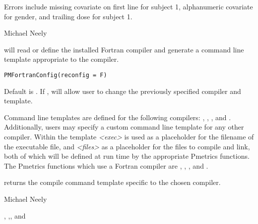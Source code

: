 \documentclass[a4paper]{book}
\begin{document}
%
\begin{Details}\relax
Errors include missing covariate on first line for subject 1, alphanumeric covariate for
gender, and trailing dose for subject 1.
\end{Details}
%
\begin{Author}\relax
Michael Neely
\end{Author}
%
\begin{Description}\relax
{} will read or define the installed Fortran compiler and generate
a command line template appropriate to the compiler.
\end{Description}
%
\begin{Usage}
\begin{verbatim}
PMFortranConfig(reconfig = F)
\end{verbatim}
\end{Usage}
%
\begin{Arguments}
\begin{ldescription}
\item[\code{reconfig}] Default is .  If , will allow user to change
the previously specified compiler and template.
\end{ldescription}
\end{Arguments}
%
\begin{Details}\relax
Command line templates are defined for the following compilers: , ,
, and .  Additionally, users may specify a custom command line
template for any other compiler.  Within the template \emph{<exec>} is used as a placeholder
for the filename of the executable file, and \emph{<files>} as a placeholder for the files to
compile and link, both of which will be defined at run time by the appropriate Pmetrics functions.
The Pmetrics functions which use a Fortran compiler are , ,
, and .
\end{Details}
%
\begin{Value}
 returns the compile command template specific to the chosen
compiler.
\end{Value}
%
\begin{Author}\relax
Michael Neely
\end{Author}
%
\begin{SeeAlso}\relax
{}, ,, and
\end{SeeAlso}
\end{document}
